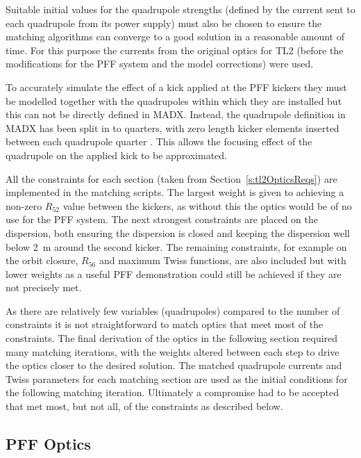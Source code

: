 Suitable initial values for the quadrupole strengths (defined by the current sent to each quadrupole from its power supply) must also be chosen to ensure the matching algorithms can converge to a good solution in a reasonable amount of time. For this purpose the currents from the original optics for TL2 (before the modifications for the PFF system and the model corrections) were used. 

To accurately simulate the effect of a kick applied at the PFF kickers they must be modelled together with the quadrupoles within which they are installed but this can not be directly defined in MADX. Instead, the quadrupole definition in MADX has been split in to quarters, with zero length kicker elements inserted between each quadrupole quarter \cite{piotrPriv}. This allows the focusing effect of the quadrupole on the applied kick to be approximated.

All the constraints for each section (taken from Section~\ref{s:tl2OpticsReqs}) are implemented in the matching scripts. The largest weight is given to achieving a non-zero \(R_{52}\) value between the kickers, as without this the optics would be of no use for the PFF system. The next strongest constraints are placed on the dispersion, both ensuring the dispersion is closed and keeping the dispersion well below 2~m around the second kicker. The remaining constraints, for example on the orbit closure, \(R_{56}\) and maximum Twiss functions, are also included but with lower weights as a useful PFF demonstration could still be achieved if they are not precisely met.

As there are relatively few variables (quadrupoles) compared to the number of constraints  it is not straightforward to match optics that meet most of the constraints. The final derivation of the optics in the following section required many matching iterations, with the weights altered between each step to drive the optics closer to the desired solution. The matched quadrupole currents and Twiss parameters for each matching section are used as the initial conditions for the following matching iteration. Ultimately a compromise had to be accepted that met most, but not all, of the constraints as described below.

\subsection{PFF Optics}
\label{ss:tl2PFFOptics}

